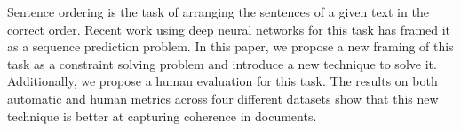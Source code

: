 Sentence ordering is the task of arranging the sentences of a given text in the correct order. Recent work using deep neural networks for this task has framed it as a sequence prediction problem. In this paper, we propose a new framing of this task as a constraint solving problem and introduce a new technique to solve it. Additionally, we propose a human evaluation for this task. The results on both automatic and human metrics across four different datasets show that this new technique is better at capturing coherence in documents.
